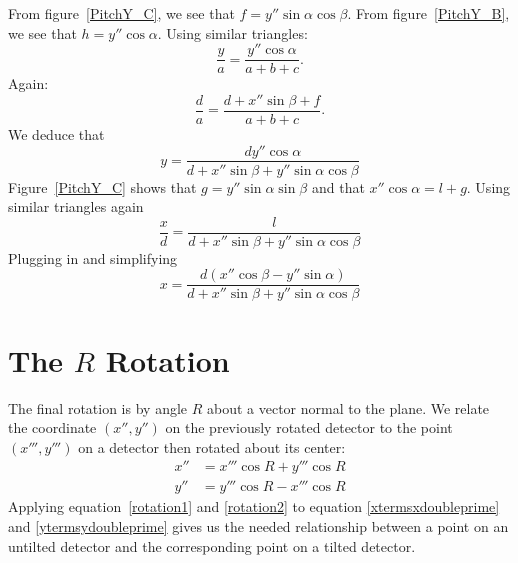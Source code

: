 \begin{SCfigure}[1][bthp]
    \centering
     
    \label{PitchY_A}
    \caption{A diagram of a plane that has been 
    rotate by angle $\beta$ about the $\hat y$ axis 
    and then by $\alpha$ about the $\hat x'$ axis.}
\end{SCfigure}

\begin{SCfigure}[1][bthp]
    \centering
     
    \label{PitchY_B}
    \caption{A more geometrical diagram
    of figure~\ref{PitchY_A}.}
\end{SCfigure}

\begin{SCfigure}[1][bthp]
    \centering
     
    \label{PitchY_C}
    \caption{A cross section of the $y=0$ plane.}

\end{SCfigure}

From figure~\ref{PitchY_C}, we see  
that $f=y''\sin\alpha\cos\beta$. From figure~\ref{PitchY_B},
we see that $h=y''\cos\alpha$. Using similar
triangles:
\begin{equation}
    \frac{y}{a} = \frac{y''\cos\alpha}{a+b+c}.
\end{equation}
Again:
\begin{equation}
    \frac{d}{a} = \frac{d+x''\sin\beta+f}{a+b+c}.
\end{equation}
We deduce that
\begin{equation}\label{ytermsydoubleprime}
    \boxed{y=\frac{dy''\cos\alpha}{
    d+x''\sin\beta+y''\sin\alpha\cos\beta}}
\end{equation}
Figure~\ref{PitchY_C} shows that 
$g=y''\sin\alpha\sin\beta$ and that 
$x''\cos\alpha=l+g$. Using similar triangles again 
\begin{equation}
    \frac{x}{d} = \frac{l}{d+x''\sin\beta+
    y''\sin\alpha\cos\beta}
\end{equation}
Plugging in and simplifying
\begin{equation}\label{xtermsxdoubleprime}
    \boxed{x=\frac{d(x''\cos\beta-y''\sin\alpha)}{
    d+x''\sin\beta+y''\sin\alpha\cos\beta}}
\end{equation}

\section{\texorpdfstring{The $R$ Rotation}{The R Rotation}}

The final rotation is by angle $R$ about a vector normal
to the plane. We relate the coordinate $(x'',y'')$ on the 
previously rotated detector to the point $(x''',y''')$ on 
a detector then rotated about its center:
\begin{align}
    x''&=x'''\cos R + y'''\cos R\label{rotation1}\\
    y''&=y'''\cos R - x'''\cos R\label{rotation2}
\end{align}
Applying equation~\ref{rotation1} and \ref{rotation2}
to equation \ref{xtermsxdoubleprime} and \ref{ytermsydoubleprime}
gives us the needed relationship between a point on an untilted
detector and the corresponding point on a tilted detector.

